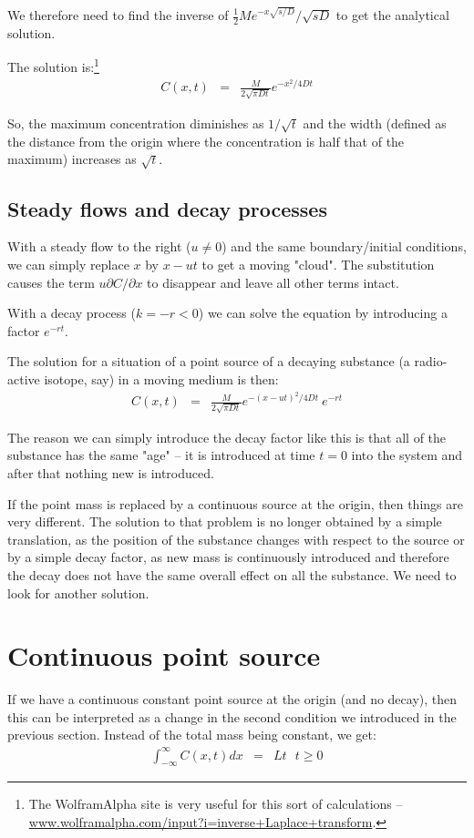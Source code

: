 \documentclass[onecolumn]{article}
\begin{document}
We therefore need to find the inverse of $\frac{1}{2} M e^{-x \sqrt{s/D}} / \sqrt{sD}$ to get the analytical solution.

The solution is:\footnote{The WolframAlpha site is very useful for this sort of calculations -- \url{www.wolframalpha.com/input?i=inverse+Laplace+transform}.}
\begin{eqnarray}
\nonumber   C(x,t) &=& \frac{M}{2 \sqrt{\pi D t}} e^{-x^2/4Dt}
\end{eqnarray}

So, the maximum concentration diminishes as $1/\sqrt{t}$ and the width (defined as the distance from the origin where
the concentration is half that of the maximum) increases as $\sqrt{t}$.

\subsection*{Steady flows and decay processes}
With a steady flow to the right ($u \neq 0$) and the same boundary/initial conditions, we can simply replace $x$ by $x-ut$
to get a moving "cloud". The substitution causes the term $u \partial C / \partial x$ to disappear and leave all other
terms intact.

With a decay process ($k = -r < 0$) we can solve the equation by introducing a factor $e^{-rt}$.

The solution for a situation of a point source of a decaying substance (a radio-active isotope, say) in a moving medium
is then:
\begin{eqnarray}
\nonumber   C(x,t) &=& \frac{M}{2 \sqrt{\pi D t}} e^{-(x - ut)^2/4Dt} ~e^{-rt}
\end{eqnarray}

The reason we can simply introduce the decay factor like this is that all of the substance has the same "age" -- it
is introduced at time $t = 0$ into the system and after that nothing new is introduced.

If the point mass is replaced by a continuous source at the origin, then things are very different. The solution
to that problem is no longer obtained by a simple translation, as the position of the substance changes with respect
to the source or by a simple decay factor, as new mass is continuously introduced and therefore the decay does
not have the same overall effect on all the substance. We need to look for another solution.


\section*{Continuous point source}
If we have a continuous constant point source at the origin (and no decay), then this can be interpreted as a change in the second condition
we introduced in the previous section. Instead of the total mass being constant, we get:
\begin{eqnarray}
\nonumber   \int^{\infty}_{-\infty} C(x,t) dx &=& Lt  ~~~ t \geq 0
\end{eqnarray}
\end{document}
